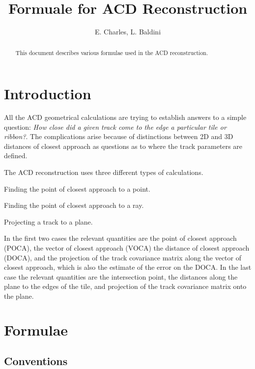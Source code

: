 \documentclass[fleqn,twoside,draft]{article}
\title{Formuale for ACD Reconstruction}
\author{E. Charles, L. Baldini}
\begin{document}
\maketitle


%
%
\begin{abstract}

This document describes various formulae used in the ACD reconstruction.
\vspace{1pc}
\end{abstract}

%
%
\section{Introduction \label{sec:introduction}}

All the ACD geometrical calculations are trying to establish answers to a simple question: {\em How close did a given track come to the edge a particular tile or ribbon?}.  The complications arise because of distinctions between 2D and 3D distances of closest approach as questions as to where the track parameters are defined.  

The ACD reconstruction uses three different types of calculations.
\begin{enumerate}
  {\item Finding the point of closest approach to a point.}
  {\item Finding the point of closest approach to a ray.}
  {\item Projecting a track to a plane.}
\end{enumerate}

In the first two cases the relevant quantities are the point of closest approach (POCA), the vector of closest approach (VOCA) the distance of closest approach (DOCA), and the projection of the track covariance matrix along the vector of closest approach, which is also the estimate of the error on the DOCA.  In the last case the relevant quantities are the intersection point, the distances along the plane to the edges of the tile, and projection of the track covariance matrix onto the plane.  
%
% 
\section{Formulae \label{sec:formulae}}

\subsection{Conventions}
\end{document}
